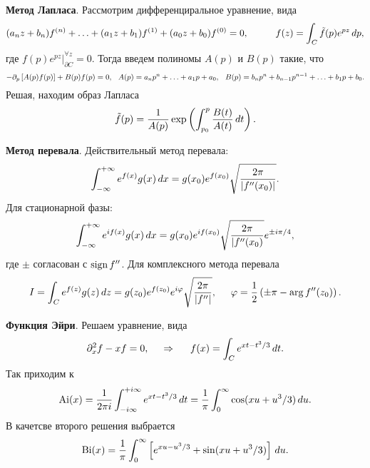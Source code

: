 \textbf{Метод Лапласа}. Рассмотрим дифференциральное уравнение, вида
\begin{equation*}
    (a_n z + b_n) f^{(n)} + \ldots + (a_1 z + b_1) f^{(1)} + (a_0 z + b_0) f^{(0)} = 0,
    \hspace{10 mm} 
    f(z) = \int_C \tilde{f} (p) e^{pz} \d p,
\end{equation*}
где $f(p) e^{pz} |_{\partial C}^{\forall  z} = 0$. Тогда введем полиномы $A(p)$ и $B(p)$ такие, что
\begin{equation*}
    - \partial_p \left[ A(p) f(p)\right] + B(p) f(p) = 0,
    \hspace{2.5 mm} 
    A(p) = a_n p^n +\ldots + a_1 p + a_0,
    \hspace{2.5 mm} 
    B(p) = b_n p^n + b_{n-1} p^{n-1} + \ldots + b_1 p + b_0.
\end{equation*}
Решая, находим образ Лапласа
\begin{equation*}
    \tilde{f}(p) = \frac{1}{A(p)} \exp\left(
        \int_{p_0}^{p} \frac{B(t)}{A(t)}\, d t
    \right).
\end{equation*}


\textbf{Метод перевала}. Действительный метод перевала:
\begin{equation*}
    \int_{-\infty}^{+\infty} e^{f(x)} g(x) \, d x = g(x_0) e^{f(x_0)} \sqrt{\frac{2\pi}{|f''(x_0)|}}.
\end{equation*}
Для стационарной фазы:
\begin{equation*}
    \int_{-\infty}^{+\infty} e^{i f(x)} g(x) \, d x = g(x_0) e^{i f (x_0)} 
    \sqrt{\frac{2\pi}{|f''(x_0)}} e^{\pm i \pi/4},
\end{equation*} 
где $\pm$ согласован с $\mathop{\mathrm{sign}}\nolimits f''$. 
Для комплексного метода перевала
\begin{equation*}
    I = \int_C e^{f(z)} g(z) \, d z = g(z_0) e^{f(z_0)} e^{i \varphi} \sqrt{\frac{2\pi}{|f''|}},
    \hspace{5 mm} 
    \varphi = \frac{1}{2}\left(\pm \pi - \arg f''(z_0) \right).
\end{equation*}




\textbf{Функция Эйри}. Решаем уравнение, вида
\begin{equation*}
    \partial_x^2 f - x f = 0,
    \hspace{0.5cm} \Rightarrow \hspace{0.5cm}
    f(x) = \int_C e^{x t - t^3/3} \, d t.
\end{equation*}
Так приходим к
\begin{equation*}
    \textnormal{Ai} (x) = 
    \frac{1}{2 \pi i} \int_{- i \infty}^{+i \infty} e^{xt - t^3/3} \, d t= 
    \frac{1}{\pi} \int_{0}^{\infty} \cos(x u + u^3/3) \, d u.
\end{equation*}
В качетсве второго решения выбрается 
\begin{equation*}
    \textnormal{Bi} (x) = \frac{1}{\pi} \int_{0}^{\infty} \left[
        e^{xu - u^3/3}  + \sin (xu + u^3/3)
    \right]\, d u.
\end{equation*}
